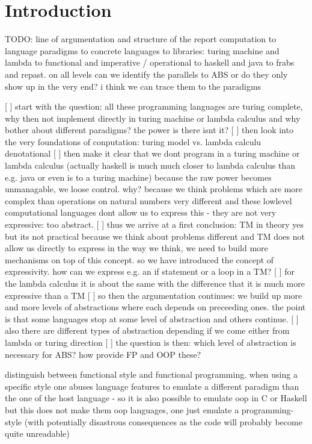 \chapter{Introduction}

TODO: line of argumentation and structure of the report
computation to language paradigms to concrete languages to libraries: turing machine and lambda to functional and imperative / operational to haskell and java to frabs and repast. on all levels can we identify the parallels to ABS or do they only show up in the very end? i think we can trace them to the paradigms 

[ ] start with the question: all these programming languages are turing complete, why then not implement directly in turing machine or lambda calculus and why bother about different paradigms? the power is there isnt it?
[ ] then look into the very foundations of conputation: turing model vs. lambda calculu denotational
[ ] then make it clear that we dont program in a turing machine or lambda calculus (actually haskell is much much closer to lambda calculus than e.g. java or even is to a turing machine) because the raw power becomes unmanagable, we loose control. why? because we think problems which are more complex than operations on natural numbers very different and these lowlevel computational languages dont allow us to express this - they are not very expressive: too abstract.
[ ] thus we arrive at a first conclusion: TM in theory yes but its not practical because we think about problems different and TM does not allow us directly to express in the way we think, we need to build  more mechanisms on top of this concept. so we have introduced the concept of expressivity. how can we express e.g. an if statement or a loop in a TM? 
[ ] for the lambda calculus it is about the same with the difference that it is much more expressive than a TM
[ ] so then the argumentation continues: we build up more and more levels of abstractions where each depends on preceeding ones. the point is that some languages stop at some level of abstraction and others continue.
[ ] also there are different types of abstraction depending if we come either from lambda or turing direction 
[ ] the question is then: which level of abstraction is necessary for ABS? how provide FP and OOP these?

distinguish between functional style and functional programming. when using a specific style one abuses language features to emulate a different paradigm than the one of the host language - so it is also possible to emulate oop in C or Haskell but this does not make them oop languages, one just emulate a programming-style (with potentially disastrous consequences as the code will probably become quite unreadable)

